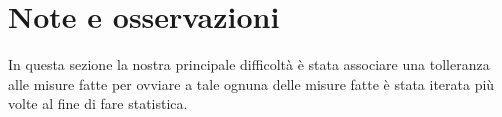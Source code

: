 \section{Note e osservazioni}
In questa sezione la nostra principale difficoltà
è stata associare una tolleranza alle misure fatte
per ovviare a tale ognuna delle misure fatte è
stata iterata più volte al fine di fare statistica.
